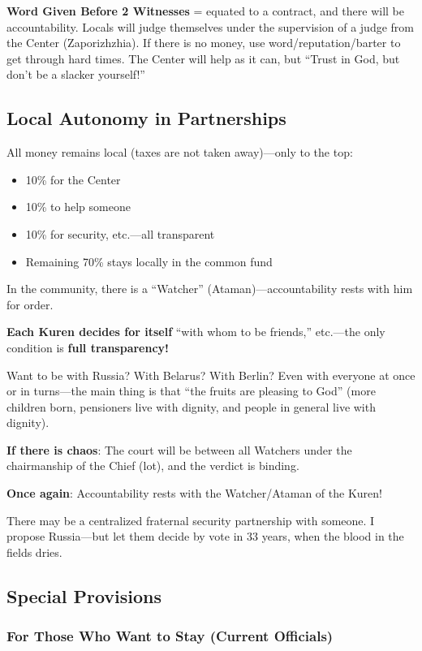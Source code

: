 \documentclass[11pt,a4paper]{article}
\theoremstyle{definition}
\theoremstyle{remark}
\begin{document}
\textbf{Word Given Before 2 Witnesses} = equated to a contract, and there will be accountability. Locals will judge themselves under the supervision of a judge from the Center (Zaporizhzhia). If there is no money, use word/reputation/barter to get through hard times. The Center will help as it can, but ``Trust in God, but don't be a slacker yourself!''

\subsection{Local Autonomy in Partnerships}

All money remains local (taxes are not taken away)—only to the top:
\begin{itemize}
\item 10\% for the Center
\item 10\% to help someone
\item 10\% for security, etc.—all transparent
\item Remaining 70\% stays locally in the common fund
\end{itemize}

In the community, there is a ``Watcher'' (Ataman)—accountability rests with him for order.

\textbf{Each Kuren decides for itself} ``with whom to be friends,'' etc.—the only condition is \textbf{full transparency!}

Want to be with Russia? With Belarus? With Berlin? Even with everyone at once or in turns—the main thing is that ``the fruits are pleasing to God'' (more children born, pensioners live with dignity, and people in general live with dignity).

\textbf{If there is chaos}: The court will be between all Watchers under the chairmanship of the Chief (lot), and the verdict is binding.

\textbf{Once again}: Accountability rests with the Watcher/Ataman of the Kuren!

There may be a centralized fraternal security partnership with someone. I propose Russia—but let them decide by vote in 33 years, when the blood in the fields dries.

\subsection{Special Provisions}

\subsubsection{For Those Who Want to Stay (Current Officials)}
\end{document}
